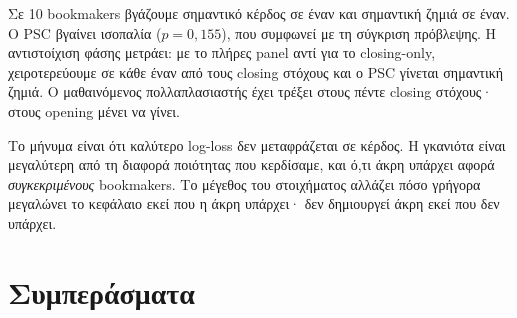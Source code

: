 \documentclass[11pt,a4paper]{article}
\renewcommand{\_}{\oldunderscore\allowbreak}
\begin{document}
Σε 10 bookmakers βγάζουμε σημαντικό κέρδος σε έναν και σημαντική ζημιά σε έναν. Ο PSC
βγαίνει ισοπαλία ($p=0{,}155$), που συμφωνεί με τη σύγκριση πρόβλεψης. Η αντιστοίχιση φάσης
μετράει: με το πλήρες panel αντί για το closing-only, χειροτερεύουμε σε κάθε έναν από τους
closing στόχους και ο PSC γίνεται σημαντική ζημιά. Ο μαθαινόμενος πολλαπλασιαστής έχει
τρέξει στους πέντε closing στόχους· στους opening μένει να γίνει.

Το μήνυμα είναι ότι καλύτερο log-loss δεν μεταφράζεται σε κέρδος. Η γκανιότα είναι
μεγαλύτερη από τη διαφορά ποιότητας που κερδίσαμε, και ό,τι άκρη υπάρχει αφορά
\emph{συγκεκριμένους} bookmakers. Το μέγεθος του στοιχήματος αλλάζει πόσο γρήγορα
μεγαλώνει το κεφάλαιο εκεί που η άκρη υπάρχει· δεν δημιουργεί άκρη εκεί που δεν υπάρχει.

\section{Συμπεράσματα}
\end{document}
